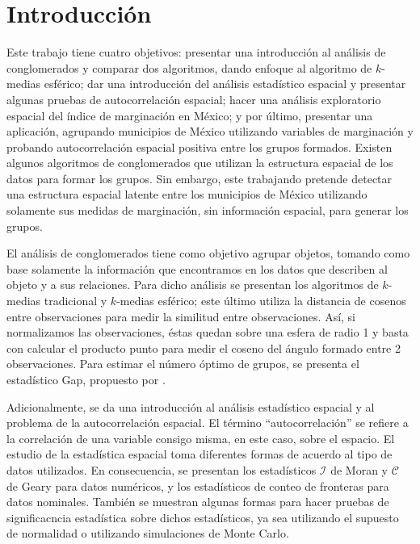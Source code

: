 \chapter{Introducción}

Este trabajo tiene cuatro objetivos: presentar una introducción al análisis de conglomerados y comparar dos algoritmos, dando enfoque al algoritmo de $k$-medias esférico; dar una introducción del análisis estadístico espacial y presentar algunas pruebas de autocorrelación espacial; hacer una análisis exploratorio espacial del índice de marginación en México; y por último, presentar una aplicación, agrupando municipios de México utilizando variables de marginación y probando autocorrelación espacial positiva entre los grupos formados. Existen algunos algoritmos de conglomerados que utilizan la estructura espacial de los datos para formar los grupos. Sin embargo, este trabajando pretende detectar una estructura espacial latente entre los municipios de México utilizando solamente sus medidas de marginación, sin información espacial, para generar los grupos.

El análisis de conglomerados tiene como objetivo agrupar objetos, tomando como base solamente la información que encontramos en los datos que describen al objeto y a sus relaciones. Para dicho análisis se presentan los algoritmos de $k$-medias tradicional y $k$-medias esférico; este último utiliza la distancia de cosenos entre observaciones para medir la similitud entre observaciones. Así, si normalizamos las observaciones, éstas quedan sobre una esfera de radio 1 y basta con calcular el producto punto para medir el coseno del ángulo formado entre 2 observaciones. Para estimar el número óptimo de grupos, se presenta el estadístico Gap, propuesto por \citet{tibshirani01}.

Adicionalmente, se da una introducción al análisis estadístico espacial y al problema de la autocorrelación espacial. El término ``autocorrelación'' se refiere a la correlación de una variable consigo misma, en este caso, sobre el espacio. El estudio de la estadística espacial toma diferentes formas de acuerdo al tipo de datos utilizados. En consecuencia, se presentan los estadísticos $\mathcal{I}$ de Moran y $\mathcal{C}$ de Geary para datos numéricos, y los estadísticos de conteo de fronteras para datos nominales. También se muestran algunas formas para hacer pruebas de significacncia estadística sobre dichos estadísticos, ya sea utilizando el supuesto de normalidad o utilizando simulaciones de Monte Carlo.

